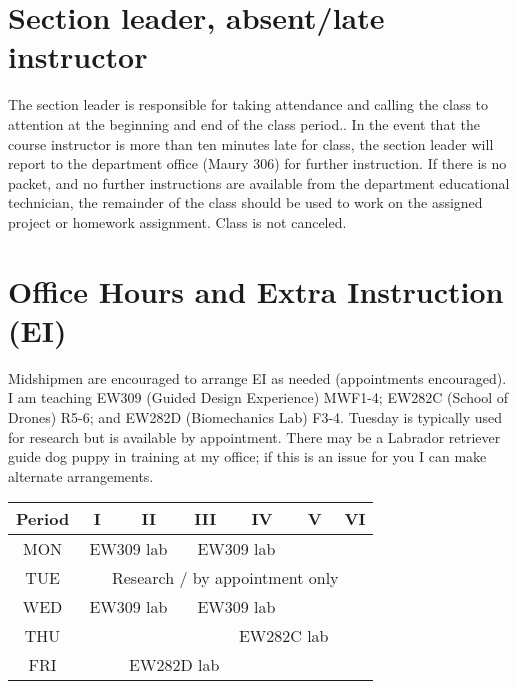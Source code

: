 \documentclass[11pt,courier]{navymemo}
\begin{document}
\section{Section leader, absent/late instructor}
The section leader is responsible for taking attendance and calling the class to attention at the beginning and end of the class period..  In the event that the course instructor is more than ten minutes late for class, the section leader will report to the department office (Maury 306) for further instruction. If there is no packet, and no further instructions are available from the department educational technician, the remainder of the class should be used to work on the assigned project or homework assignment.  Class is not canceled.
 
\section{Office Hours and Extra Instruction (EI)} Midshipmen are encouraged to arrange EI as needed (appointments encouraged).  I am teaching EW309 (Guided Design Experience) MWF1-4; EW282C (School of Drones) R5-6; and EW282D (Biomechanics Lab) F3-4. Tuesday is typically used for research but is available by appointment. There may be a Labrador retriever guide dog puppy in training at my office; if this is an issue for you I can make alternate arrangements. 
\begin{table}[h]
\begin{center}
\begin{tabular}[h]{| c | c | c | c | c | c | c |}
\hline
\bf Period & \bf I & \bf II & \bf III & \bf IV & \bf V & \bf VI\\
\hline
MON & \multicolumn{2}{c|}{\cellcolor{orange}EW309 lab} & \multicolumn{2}{c|}{\cellcolor{orange}EW309 lab} & &\\
\hline
TUE & \multicolumn{6}{c|}{\cellcolor{yellow}Research / by appointment only}\\
\hline
WED & \multicolumn{2}{c|}{\cellcolor{orange}EW309 lab} & \multicolumn{2}{c|}{\cellcolor{orange}EW309 lab} & &\\
\hline
THU & & & & \multicolumn{2}{c|}{\cellcolor{orange}EW282C lab} & \\
\hline
FRI & & \multicolumn{2}{c|}{\cellcolor{orange}EW282D lab} & & & \\
\hline
\end{tabular}
\end{center}
\end{table}
\end{document}
